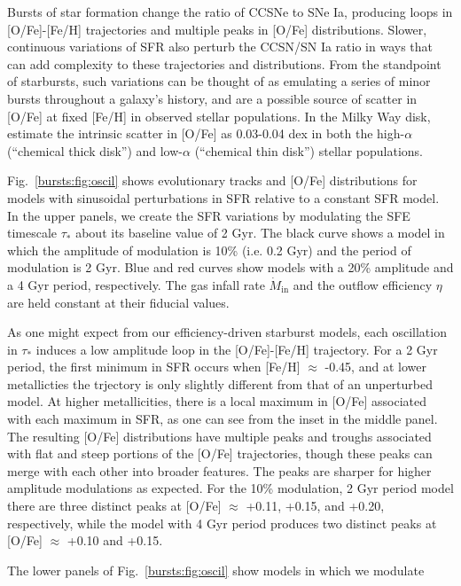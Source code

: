 Bursts of star formation change the ratio of CCSNe to SNe Ia, producing loops 
in [O/Fe]-[Fe/H] trajectories and multiple peaks in [O/Fe] distributions. 
Slower, continuous variations of SFR also perturb the CCSN/SN Ia ratio in ways 
that can add complexity to these trajectories and distributions. From the 
standpoint of starbursts, such variations can be thought of as emulating a 
series of minor bursts throughout a galaxy's history, and are a possible 
source of scatter in [O/Fe] at fixed [Fe/H] in observed stellar populations. 
In the Milky Way disk,~\citet{BertranDeLis2016} estimate the intrinsic scatter 
in [O/Fe] as 0.03-0.04 dex in both the high-$\alpha$ (``chemical thick disk'') 
and low-$\alpha$ (``chemical thin disk'') stellar populations. 
\par
Fig.~\ref{bursts:fig:oscil} shows evolutionary tracks and [O/Fe] distributions for 
models with sinusoidal perturbations in SFR relative to a constant SFR model. 
In the upper panels, we create the SFR variations by modulating the SFE 
timescale $\tau_*$ about its baseline value of 2 Gyr. The black curve shows a 
model in which the amplitude of modulation is 10\% (i.e. 0.2 Gyr) and the 
period of modulation is 2 Gyr. Blue and red curves show models with a 20\% 
amplitude and a 4 Gyr period, respectively. The gas infall rate 
$\dot{M}_\text{in}$ and the outflow efficiency $\eta$ are held constant at 
their fiducial values. 
\par 
As one might expect from our efficiency-driven starburst models, each 
oscillation in $\tau_*$ induces a low amplitude loop in the [O/Fe]-[Fe/H] 
trajectory. For a 2 Gyr period, the first minimum in SFR occurs when [Fe/H] 
$\approx$ -0.45, and at lower metallicties the trjectory is only slightly 
different from that of an unperturbed model. At higher metallicities, there 
is a local maximum in [O/Fe] associated with each maximum in SFR, as one can 
see from the inset in the middle panel. The resulting [O/Fe] distributions 
have multiple peaks and troughs associated with flat and steep portions of the 
[O/Fe] trajectories, though these peaks can merge with each other into 
broader features. The peaks are sharper for higher amplitude modulations as 
expected. For the 10\% modulation, 2 Gyr period model there are three distinct 
peaks at [O/Fe] $\approx$ +0.11, +0.15, and +0.20, respectively, while the 
model with 4 Gyr period produces two distinct peaks at [O/Fe] $\approx$ +0.10 
and +0.15. 
\par 
The lower panels of Fig.~\ref{bursts:fig:oscil} show models in which we modulate 
